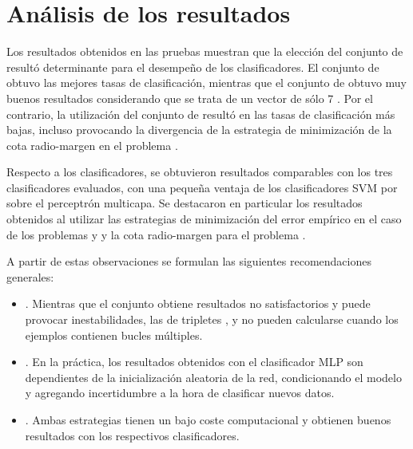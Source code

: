 %
%
%
\section{Análisis de los resultados}
%
Los resultados obtenidos en las pruebas muestran que la elección del
conjunto de  resultó determinante para el desempeño de los
clasificadores.
El conjunto de   obtuvo las mejores tasas de
clasificación, mientras que el conjunto de   obtuvo
muy buenos resultados considerando que se trata de un vector de sólo 7
.
Por el contrario, la utilización del conjunto de  
resultó en las tasas de clasificación más bajas, incluso provocando la
divergencia de la estrategia de minimización de la cota radio-margen
en el problema \prob\mipred{}.

Respecto a los clasificadores, se obtuvieron resultados comparables
con los tres clasificadores evaluados, con una pequeña ventaja de los
clasificadores SVM por sobre el perceptrón multicapa.
Se destacaron en particular los resultados obtenidos al utilizar las
estrategias de minimización del error empírico en el caso de los
problemas \prob\mipred{} y \prob\micropred{} y la cota radio-margen
para el problema \prob\tripletsvm{}.

A partir de estas observaciones se formulan las siguientes
recomendaciones generales:
%
\begin{itemize}
\item
  .
  Mientras que el conjunto  obtiene resultados no
  satisfactorios y puede provocar inestabilidades, las  de
  tripletes ,  y  no pueden calcularse
  cuando los ejemplos contienen bucles múltiples.
\item
  .
  En la práctica, los resultados obtenidos con el clasificador MLP son
  dependientes de la inicialización aleatoria de la red, condicionando
  el modelo y agregando incertidumbre a la hora de clasificar nuevos
  datos.
\item
  .
  Ambas estrategias tienen un bajo coste computacional y obtienen
  buenos resultados con los respectivos clasificadores.
\end{itemize}
%
